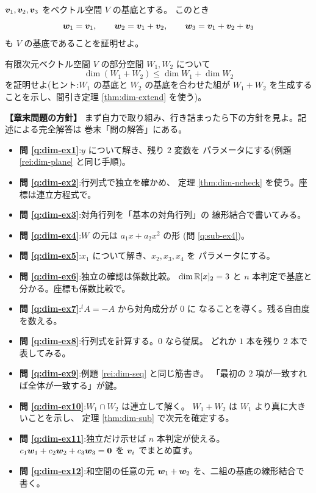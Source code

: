\begin{mondai}[証明]\label{q:dim-ex11}
$\bm{v}_1, \bm{v}_2, \bm{v}_3$ をベクトル空間 $V$ の基底とする。
このとき
\[
\bm{w}_1 = \bm{v}_1, \qquad
\bm{w}_2 = \bm{v}_1 + \bm{v}_2, \qquad
\bm{w}_3 = \bm{v}_1 + \bm{v}_2 + \bm{v}_3
\]
も $V$ の基底であることを証明せよ。
\end{mondai}

\begin{mondai}[証明]\label{q:dim-ex12}
有限次元ベクトル空間 $V$ の部分空間 $W_1, W_2$ について
\[
\dim(W_1 + W_2) \le \dim W_1 + \dim W_2
\]
を証明せよ(ヒント:$W_1$ の基底と $W_2$ の基底を合わせた組が
$W_1 + W_2$ を生成することを示し、間引き定理 \ref{thm:dim-extend} を使う)。
\end{mondai}

\bigskip
{\small
\noindent\textbf{【章末問題の方針】}\quad
まず自力で取り組み、行き詰まったら下の方針を見よ。記述による完全解答は
巻末「問の解答」にある。
\begin{itemize}
\item \textbf{問 \ref{q:dim-ex1}}:$y$ について解き、残り $2$ 変数を
パラメータにする(例題 \ref{rei:dim-plane} と同じ手順)。
\item \textbf{問 \ref{q:dim-ex2}}:行列式で独立を確かめ、
定理 \ref{thm:dim-ncheck} を使う。座標は連立方程式で。
\item \textbf{問 \ref{q:dim-ex3}}:対角行列を「基本の対角行列」の
線形結合で書いてみる。
\item \textbf{問 \ref{q:dim-ex4}}:$W$ の元は $a_1 x + a_2 x^2$ の形
(問 \ref{q:sub-ex4})。
\item \textbf{問 \ref{q:dim-ex5}}:$x_1$ について解き、$x_2, x_3, x_4$ を
パラメータにする。
\item \textbf{問 \ref{q:dim-ex6}}:独立の確認は係数比較。
$\dim \mathbb{R}[x]_2 = 3$ と $n$ 本判定で基底と分かる。座標も係数比較で。
\item \textbf{問 \ref{q:dim-ex7}}:${}^t\!A = -A$ から対角成分が $0$ に
なることを導く。残る自由度を数える。
\item \textbf{問 \ref{q:dim-ex8}}:行列式を計算する。$0$ なら従属。
どれか $1$ 本を残り $2$ 本で表してみる。
\item \textbf{問 \ref{q:dim-ex9}}:例題 \ref{rei:dim-seq} と同じ筋書き。
「最初の $2$ 項が一致すれば全体が一致する」が鍵。
\item \textbf{問 \ref{q:dim-ex10}}:$W_1 \cap W_2$ は連立して解く。
$W_1 + W_2$ は $W_1$ より真に大きいことを示し、
定理 \ref{thm:dim-sub} で次元を確定する。
\item \textbf{問 \ref{q:dim-ex11}}:独立だけ示せば $n$ 本判定が使える。
$c_1\bm{w}_1 + c_2\bm{w}_2 + c_3\bm{w}_3 = \bm{0}$ を
$\bm{v}_i$ でまとめ直す。
\item \textbf{問 \ref{q:dim-ex12}}:和空間の任意の元
$\bm{w}_1 + \bm{w}_2$ を、二組の基底の線形結合で書く。
\end{itemize}
}

